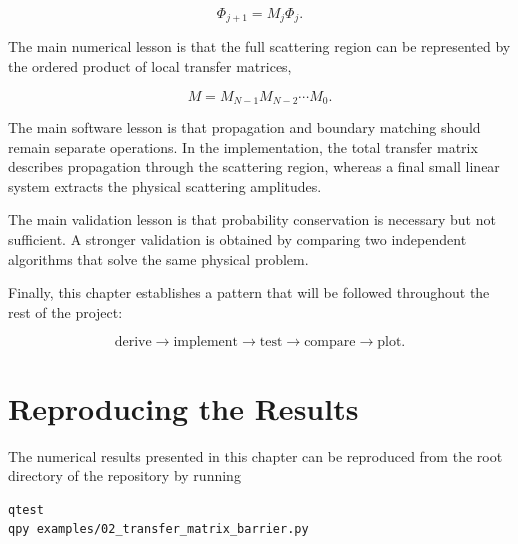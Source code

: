 \[
	\Phi_{j+1}
	=
	M_j
	\Phi_j.
\]

The main numerical lesson is that the full scattering region can be
represented by the ordered product of local transfer matrices,

\[
	M
	=
	M_{N-1}
	M_{N-2}
	\cdots
	M_0.
\]

The main software lesson is that propagation and boundary matching
should remain separate operations. In the implementation, the total
transfer matrix describes propagation through the scattering region,
whereas a final small linear system extracts the physical scattering
amplitudes.

The main validation lesson is that probability conservation is necessary
but not sufficient. A stronger validation is obtained by comparing two
independent algorithms that solve the same physical problem.

Finally, this chapter establishes a pattern that will be followed
throughout the rest of the project:

\[
\text{derive}
\longrightarrow
\text{implement}
\longrightarrow
\text{test}
\longrightarrow
\text{compare}
\longrightarrow
\text{plot}.
\]

\begin{center}
\end{center}

\section{Reproducing the Results}

The numerical results presented in this chapter can be reproduced from
the root directory of the repository by running

\begin{verbatim}
qtest
qpy examples/02_transfer_matrix_barrier.py
\end{verbatim}

